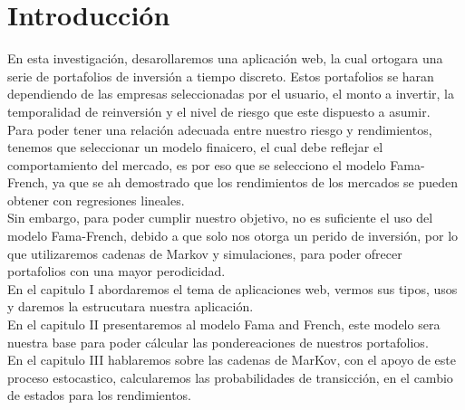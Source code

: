 \documentclass[12pt,a4paper]{article}
\begin{document}
	\section {Introducción}
	\hfill\break
	En esta investigación, desarollaremos una aplicación web, la cual  ortogara una serie de portafolios de inversión a tiempo discreto. Estos portafolios se haran dependiendo de las empresas seleccionadas por el usuario, el  monto a invertir, la temporalidad de reinversión y el nivel de riesgo que este dispuesto a asumir.\\
	\hfill\break
	Para poder tener una relación adecuada entre nuestro riesgo y rendimientos,  tenemos que seleccionar un modelo finaicero, el cual debe reflejar el comportamiento del mercado, es por eso que se selecciono el modelo Fama-French, ya que se ah demostrado que los rendimientos de los mercados se pueden obtener con regresiones lineales.\\
	\hfill\break
	Sin embargo, para poder cumplir nuestro objetivo, no es suficiente el uso del modelo Fama-French, debido a que solo nos otorga un perido de inversión, por lo que  utilizaremos cadenas de Markov y simulaciones, para poder ofrecer portafolios con una mayor perodicidad. \\
	\hfill\break
	En el capitulo I abordaremos el tema de aplicaciones web, vermos sus tipos, usos y daremos la  estrucutara nuestra aplicación.\\
	\hfill\break
	En el capitulo II presentaremos al modelo Fama and French, este modelo sera nuestra base para poder cálcular las pondereaciones de nuestros portafolios.\\
	\hfill\break
	En el capitulo III hablaremos sobre las cadenas de MarKov, con el apoyo de este proceso estocastico, calcularemos las probabilidades de transicción, en el cambio de estados para los rendimientos.\\
	
	\newpage
\end{document}
